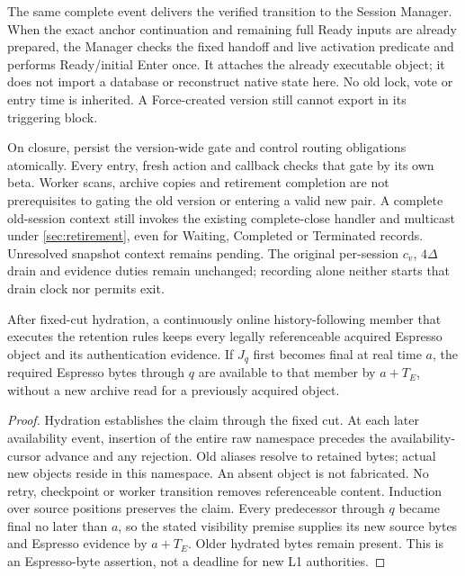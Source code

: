 The same complete event delivers the verified transition to the Session
Manager. When the exact anchor continuation and remaining full Ready
inputs are already prepared, the Manager checks the fixed handoff and
live activation predicate and performs Ready/initial Enter once. It
attaches the already executable object; it does not import a database
or reconstruct native state here. No old lock, vote or entry time is
inherited. A Force-created version still cannot export in its triggering
block.

On closure, persist the version-wide  gate and control
routing obligations atomically. Every entry, fresh action and callback
checks that gate by its own beta. Worker scans, archive copies and
retirement completion are not prerequisites to gating the old version
or entering a valid new pair. A complete old-session context still
invokes the existing complete-close handler and multicast under
\cref{sec:retirement}, even for Waiting, Completed or Terminated records.
Unresolved snapshot context remains pending. The original per-session
$c_v$, $4\Delta$ drain and evidence duties remain unchanged; recording
 alone neither starts that drain clock nor permits exit.

\begin{proposition}
\label{prop:retained-public-bytes}
After fixed-cut hydration, a continuously online history-following
member that executes the retention rules keeps every legally
referenceable acquired Espresso object and its authentication evidence.
If $J_q$ first becomes final at real time $a$, the required Espresso
bytes through $q$ are available to that member by $a+T_E$, without a
new archive read for a previously acquired object.
\end{proposition}
\begin{proof}
Hydration establishes the claim through the fixed cut. At each later
availability event, insertion of the entire raw namespace precedes the
availability-cursor advance and any rejection. Old aliases resolve to
retained bytes; actual new objects reside in this namespace. An absent
object is not fabricated. No retry, checkpoint or worker transition
removes referenceable content. Induction over source positions preserves
the claim. Every predecessor through $q$ became final no later than $a$,
so the stated visibility premise supplies its new source bytes and
Espresso evidence by $a+T_E$. Older hydrated bytes remain present.
This is an Espresso-byte assertion, not a deadline for new L1 authorities.
\end{proof}


